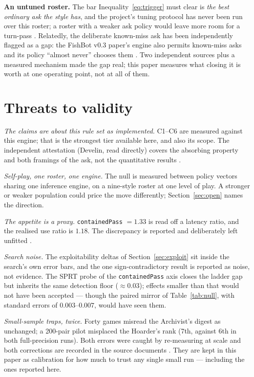 \documentclass[11pt]{article}
\newcommand{\code}[1]{\texttt{#1}}
\begin{document}
\textbf{An untuned roster.} The bar Inequality~\eqref{eq:trigger} must clear
is \emph{the best ordinary ask the style has}, and the project's tuning
protocol has never been run over this roster; a roster with a weaker ask
policy would leave more room for a turn-pass \cite{styles}. Relatedly, the
deliberate known-miss ask has been independently flagged as a gap: the
FishBot v0.3 paper's engine also permits known-miss asks and its policy
``almost never'' chooses them \cite{containment}. Two independent sources
plus a measured mechanism made the gap real; this paper measures what closing
it is worth at one operating point, not at all of them.

\section{Threats to validity}
\label{sec:threats}

\emph{The claims are about this rule set as implemented.} C1--C6 are
measured against this engine; that is the strongest tier available here, and
also its scope. The independent attestation (Develin, read directly) covers
the absorbing property and both framings of the ask, not the quantitative
results \cite{containment}.

\emph{Self-play, one roster, one engine.} The null is measured between
policy vectors sharing one inference engine, on a nine-style roster at one
level of play. A stronger or weaker population could price the move
differently; Section~\ref{sec:open} names the direction.

\emph{The appetite is a proxy.} \code{containedPass} $= 1.33$ is read off a
latency ratio, and the realised use ratio is $1.18$. The discrepancy is
reported and deliberately left unfitted \cite{styles}.

\emph{Search noise.} The exploitability deltas of Section~\ref{sec:exploit}
sit inside the search's own error bars, and the one sign-contradictory
result is reported as noise, not evidence. The SPRT probe of the
\code{containedPass} axis closes the ladder gap but inherits the same
detection floor ($\approx 0.03$); effects smaller than that would not have
been accepted --- though the paired mirror of Table~\ref{tab:null}, with
standard errors of $0.003$--$0.007$, would have seen them.

\emph{Small-sample traps, twice.} Forty games misread the Archivist's digest
as unchanged; a 200-pair pilot misplaced the Hoarder's rank (7th, against 6th
in both full-precision runs). Both errors were caught by re-measuring at
scale and both corrections are recorded in the source documents
\cite{styles}. They are kept in this paper as calibration for how much to
trust any single small run --- including the ones reported here.
\end{document}
